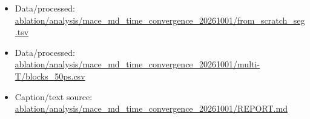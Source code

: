 \begin{itemize}[leftmargin=1.4em,noitemsep]
\item Data/processed: \begingroup\scriptsize\url{ablation/analysis/mace_md_time_convergence_20261001/from_scratch_seg.tsv}\endgroup
\item Data/processed: \begingroup\scriptsize\url{ablation/analysis/mace_md_time_convergence_20261001/multi-T/blocks_50ps.csv}\endgroup
\item Caption/text source: \begingroup\scriptsize\url{ablation/analysis/mace_md_time_convergence_20261001/REPORT.md}\endgroup
\end{itemize}
